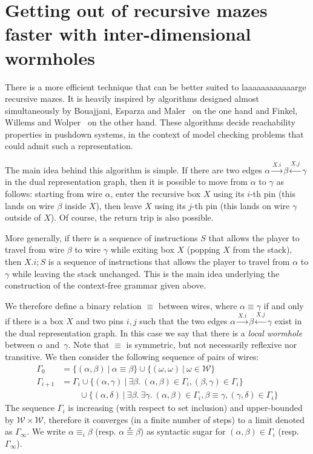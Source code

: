 \documentclass[a4paper,UKenglish,cleveref, autoref]{lipics-v2021}
\begin{document}
\section{Getting out of recursive mazes faster with inter-dimensional wormholes}
\label{sec:modelchecking}


There is a more efficient technique that can be better suited to
laaaaaaaaaaaarge recursive mazes. It is heavily inspired by algorithms designed
almost simultaneously by Bouajjani, Esparza and
Maler~\cite{DBLP:conf/concur/BouajjaniEM97} on the one hand and Finkel, Willems
and Wolper~\cite{DBLP:journals/entcs/FinkelWW97} on the other hand. These
algorithms decide reachability properties in pushdown systems, in the context of
model checking problems that could admit such a representation.

The main idea behind this algorithm is simple. If there are two edges
$\alpha \xrightarrow{X.i} \beta \xleftarrow{X.j} \gamma$ in the dual
representation graph, then it is possible to move from $\alpha$ to $\gamma$ as
follows: starting from wire $\alpha$, enter the recursive box $X$ using its
$i$-th pin (this lands on wire $\beta$ inside $X$), then leave $X$ using its
$j$-th pin (this lands on wire $\gamma$ outside of $X$). Of course, the return trip is also possible.

More generally, if there is a sequence of instructions $S$ that allows the
player to travel from wire $\beta$ to wire $\gamma$ while exiting box $X$
(popping $X$ from the stack), then $X.i ; S$ is a sequence of instructions that
allows the player to travel from $\alpha$ to $\gamma$ while leaving the stack
unchanged. This is the main idea underlying the construction of the context-free
grammar given above.

We therefore define a binary relation $\equiv$ between wires, where
$\alpha \equiv \gamma$ if and only if there is a box $X$ and two pins $i, j$
such that the two edges $\alpha \xrightarrow{X.i} \beta \xleftarrow{X.j} \gamma$
exist in the dual representation graph. In this case we say that there is a
\emph{local wormhole} between $\alpha$ and~$\gamma$. Note that $\equiv$ is
symmetric, but not necessarily reflexive nor transitive. We then consider the
following sequence of pairs of wires:
\begin{align*}
  \Gamma_0 &= \{ (\alpha, \beta) ~|~ \alpha \equiv \beta \} \cup \{ (\omega, \omega) ~|~ \omega \in \mathcal{W} \} \\
  \Gamma_{i+1} &= \Gamma_i \cup \{ (\alpha, \gamma) ~|~ \exists \beta. ~ (\alpha, \beta) \in \Gamma_i, (\beta, \gamma) \in \Gamma_i \} \\
           & ~\quad \phantom{\Gamma_i} \cup \{ (\alpha, \delta) ~|~ \exists \beta. ~ \exists \gamma. ~ (\alpha, \beta) \in \Gamma_i, \beta \equiv \gamma, (\gamma, \delta) \in \Gamma_i \}
\end{align*}
The sequence $\Gamma_i$ is increasing (with respect to set inclusion) and
upper-bounded by $\mathcal{W} \times \mathcal{W}$, therefore it converges (in a
finite number of steps) to a limit denoted as $\Gamma_\infty$. We write
$\alpha \equiv_i \beta$ (resp. $\alpha \stackrel{*}{\equiv} \beta$) as
syntactic sugar for $(\alpha, \beta) \in \Gamma_i$ (resp. $\Gamma_\infty$).
\end{document}
